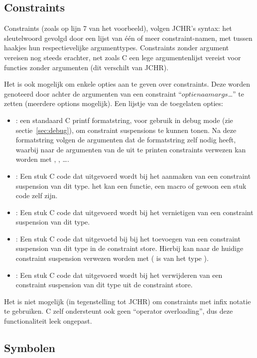 \subsection{Constraints}

Constraints (zoals op lijn 7 van het voorbeeld), volgen JCHR's syntax: het  sleutelwoord gevolgd door een lijst van \'e\'en of meer constraint-namen, met tussen haakjes hun respectievelijke argumenttypes. Constraints zonder argument vereisen nog steeds \code{()} erachter, net zoals C een lege argumentenlijst vereist voor functies zonder argumenten (dit verschilt van JCHR).

Het is ook mogelijk om enkele opties aan te geven over constraints. Deze worden genoteerd door achter de argumenten van een constraint ``$optienaam$\code{,}$args$\ldots\code{)}'' te zetten (meerdere options mogelijk). Een lijstje van de
toegelaten opties: \begin{itemize}
  \item {}: een standaard C printf formatstring, voor gebruik in debug mode (zie sectie~\ref{sec:debug}), om constraint suspensions te kunnen tonen. Na deze formatstring volgen de argumenten dat de formatstring zelf nodig heeft, waarbij naar de argumenten van de uit te printen constraints verwezen kan worden met , , \ldots.
  \item {}: Een stuk C code dat uitgevoerd wordt bij het aanmaken van een constraint suspension van dit type. het kan een functie, een macro of gewoon een stuk code zelf zijn.
  \item {}: Een stuk C code dat uitgevoerd wordt bij het vernietigen van een constraint suspension van dit type. 
  \item {}: Een stuk C code dat uitgevoetd bij bij het toevoegen van een constraint suspension van dit type in de constraint store. Hierbij kan naar de huidige constraint suspension verwezen worden met  ( is van het type ).
  \item {}: Een stuk C code dat uitgevoerd wordt bij het verwijderen van een constraint suspension van dit type uit de constraint store.
\end{itemize}

Het is niet mogelijk (in tegenstelling tot JCHR) om constraints met infix notatie te gebruiken. C zelf ondersteunt ook geen ``operator overloading'', dus deze functionaliteit leek ongepast.

\subsection{Symbolen}

